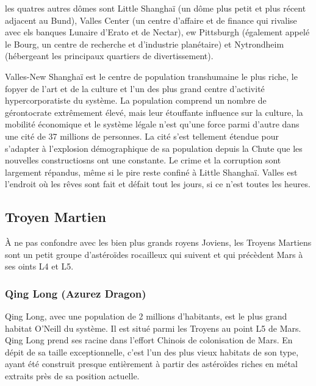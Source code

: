                                                                les quatres autres dômes sont Little Shanghaï (un dôme plus petit et plus récent adjacent au Bund), Valles Center (un centre d'affaire et de finance qui rivalise avec els banques Lunaire d'Erato et de Nectar), ew Pittsburgh (également appelé le Bourg, un centre de recherche et d'industrie planétaire) et Nytrondheim (hébergeant les principaux quartiers de divertissement). 

                                                               Valles-New Shanghaï est le centre de population transhumaine le plus riche, le fopyer de l'art et de la culture et l'un des plus grand centre d'activité hypercorporatiste du système. La population comprend un nombre de gérontocrate extrêmement élevé, mais leur étouffante influence sur la culture, la mobilité économique et le système légale n'est qu'une force parmi d'autre dans une cité de 37 millions de personnes. La cité s'est tellement étendue pour s'adapter à l'explosion démographique de sa population depuis la Chute que les nouvelles constructiosns ont une constante. Le crime et la corruption sont largement répandus, même si le pire reste confiné à Little Shanghaï. Valles est l'endroit où les rêves sont fait et défait tout les jours, si ce n'est toutes les heures. 

                                                               \subsection{Troyen Martien} \label{sec:martian-trojans} 

                                                               À ne pas confondre avec les bien plus grands royens Joviens, les Troyens Martiens sont un petit groupe d'astéroïdes rocailleux qui suivent et qui précèdent Mars à ses oints L4 et L5. 

                                                               \subsubsection{Qing Long (Azurez Dragon)} \label{sec:qing-long-azurez} 

                                                               Qing Long, avec une population de 2 millions d'habitants, est le plus grand habitat O'Neill du système. Il est situé parmi les Troyens au point L5 de Mars. Qing Long prend ses racine dans l'effort Chinois de colonisation de Mars. En dépit de sa taille exceptionnelle, c'est l'un des plus vieux habitats de son type, ayant été construit presque entièrement à partir des astéroïdes riches en métal extraits près de sa position actuelle. 

